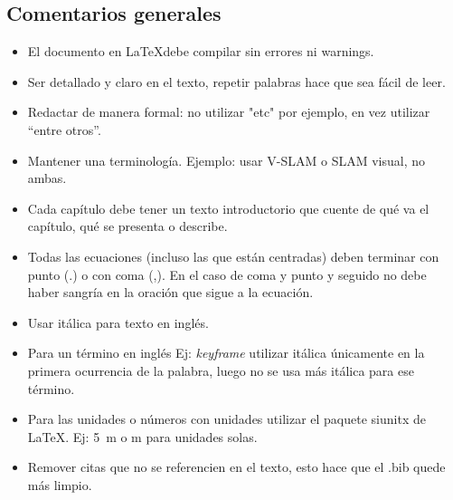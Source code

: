 \documentclass[a4paper,	11pt]{article}
\begin{document}
\subsection{Comentarios generales}
%
\begin{itemize}
    \item El documento en \LaTeX debe compilar sin errores ni warnings.

    \item Ser detallado y claro en el texto, repetir palabras hace que sea fácil de leer.

    \item Redactar de manera formal: no utilizar "etc" por ejemplo, en vez utilizar ``entre otros''.

    \item Mantener una terminología. Ejemplo: usar V-SLAM o SLAM visual, no ambas.

    \item Cada capítulo debe tener un texto introductorio que cuente de qué va el capítulo, qué se presenta o describe.
    
    \item Todas las ecuaciones (incluso las que están centradas) deben terminar con punto (.) o con coma (,). En el caso de coma y punto y seguido no debe haber sangría en la oración que sigue a la ecuación.

    \item Usar itálica para texto en inglés.

    \item Para un término en inglés Ej: \emph{keyframe} utilizar itálica únicamente en la primera ocurrencia de la palabra, luego no se usa más itálica para ese término.

    \item Para las unidades o números con unidades utilizar el paquete siunitx de \LaTeX. Ej: \SI{5}{\meter} o \si{\meter} para unidades solas.

    \item Remover citas que no se referencien en el texto, esto hace que el .bib quede más limpio.
\end{itemize}
\end{document}
